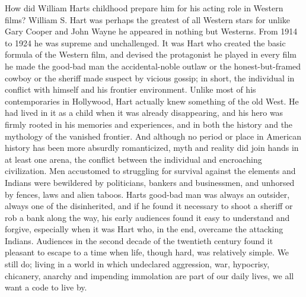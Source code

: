 \begin{enumerate}
How did William Harts childhood prepare him for his acting role in Western films? William S. Hart was perhaps the greatest of all Western stars for unlike Gary Cooper and John Wayne he appeared in nothing but Westerns.
From  1914 to 1924 he was supreme and unchallenged.
It was Hart who created the basic formula of the Western film, and devised the protagonist he played in every film he made the good-bad man the accidental-noble outlaw or the honest-but-framed cowboy or the sheriff made suspect by vicious gossip; in short, the individual in conflict with himself and his frontier environment.
Unlike most of his contemporaries in Hollywood, Hart actually knew something of the old West.
He had lived in it as a child when it was already disappearing, and his hero was firmly rooted in his memories and experiences, and in both the history and the mythology of the vanished frontier.
And although no period or place in American history has been more absurdly romanticized, myth and reality did join hands in at least one arena, the conflict between the individual and encroaching civilization.
Men accustomed to struggling for survival against the elements and Indians were bewildered by politicians, bankers and businessmen, and unhorsed by fences, laws and alien taboos.
Harts good-bad man was always an outsider, always one of the disinherited, and if he found it necessary to shoot a sheriff or rob a bank along the way, his early audiences found it easy to understand and forgive, especially when it was Hart who, in the end, overcame the attacking Indians.
Audiences in the second decade of the twentieth century found it pleasant to escape to a time when life, though hard, was relatively simple.
We still do; living in a world in which undeclared aggression, war, hypocrisy, chicanery, anarchy and impending immolation are part of our daily lives, we all want a code to live by.


\end{enumerate}

